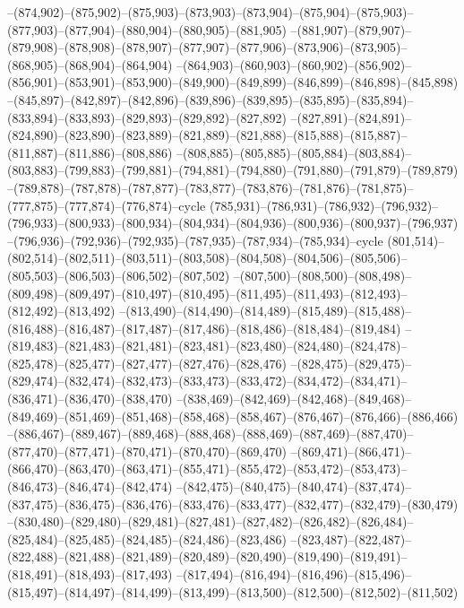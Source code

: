 --(874,902)--(875,902)--(875,903)--(873,903)--(873,904)--(875,904)--(875,903)--(877,903)--(877,904)--(880,904)--(880,905)--(881,905)
--(881,907)--(879,907)--(879,908)--(878,908)--(878,907)--(877,907)--(877,906)--(873,906)--(873,905)--(868,905)--(868,904)--(864,904)
--(864,903)--(860,903)--(860,902)--(856,902)--(856,901)--(853,901)--(853,900)--(849,900)--(849,899)--(846,899)--(846,898)--(845,898)
--(845,897)--(842,897)--(842,896)--(839,896)--(839,895)--(835,895)--(835,894)--(833,894)--(833,893)--(829,893)--(829,892)--(827,892)
--(827,891)--(824,891)--(824,890)--(823,890)--(823,889)--(821,889)--(821,888)--(815,888)--(815,887)--(811,887)--(811,886)--(808,886)
--(808,885)--(805,885)--(805,884)--(803,884)--(803,883)--(799,883)--(799,881)--(794,881)--(794,880)--(791,880)--(791,879)--(789,879)
--(789,878)--(787,878)--(787,877)--(783,877)--(783,876)--(781,876)--(781,875)--(777,875)--(777,874)--(776,874)--cycle
(785,931)--(786,931)--(786,932)--(796,932)--(796,933)--(800,933)--(800,934)--(804,934)--(804,936)--(800,936)--(800,937)--(796,937)
--(796,936)--(792,936)--(792,935)--(787,935)--(787,934)--(785,934)--cycle
(801,514)--(802,514)--(802,511)--(803,511)--(803,508)--(804,508)--(804,506)--(805,506)--(805,503)--(806,503)--(806,502)--(807,502)
--(807,500)--(808,500)--(808,498)--(809,498)--(809,497)--(810,497)--(810,495)--(811,495)--(811,493)--(812,493)--(812,492)--(813,492)
--(813,490)--(814,490)--(814,489)--(815,489)--(815,488)--(816,488)--(816,487)--(817,487)--(817,486)--(818,486)--(818,484)--(819,484)
--(819,483)--(821,483)--(821,481)--(823,481)--(823,480)--(824,480)--(824,478)--(825,478)--(825,477)--(827,477)--(827,476)--(828,476)
--(828,475)--(829,475)--(829,474)--(832,474)--(832,473)--(833,473)--(833,472)--(834,472)--(834,471)--(836,471)--(836,470)--(838,470)
--(838,469)--(842,469)--(842,468)--(849,468)--(849,469)--(851,469)--(851,468)--(858,468)--(858,467)--(876,467)--(876,466)--(886,466)
--(886,467)--(889,467)--(889,468)--(888,468)--(888,469)--(887,469)--(887,470)--(877,470)--(877,471)--(870,471)--(870,470)--(869,470)
--(869,471)--(866,471)--(866,470)--(863,470)--(863,471)--(855,471)--(855,472)--(853,472)--(853,473)--(846,473)--(846,474)--(842,474)
--(842,475)--(840,475)--(840,474)--(837,474)--(837,475)--(836,475)--(836,476)--(833,476)--(833,477)--(832,477)--(832,479)--(830,479)
--(830,480)--(829,480)--(829,481)--(827,481)--(827,482)--(826,482)--(826,484)--(825,484)--(825,485)--(824,485)--(824,486)--(823,486)
--(823,487)--(822,487)--(822,488)--(821,488)--(821,489)--(820,489)--(820,490)--(819,490)--(819,491)--(818,491)--(818,493)--(817,493)
--(817,494)--(816,494)--(816,496)--(815,496)--(815,497)--(814,497)--(814,499)--(813,499)--(813,500)--(812,500)--(812,502)--(811,502)
